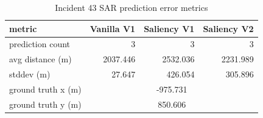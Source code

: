 \begin{table}[ht]
\centering
\caption{Incident 43 SAR prediction error metrics}
\label{tab:sar-incident-43}
\begin{tabular}{lrrr}
\hline
metric & Vanilla V1 & Saliency V1 & Saliency V2 \\
\hline
prediction count & 3 & 3 & 3 \\
avg distance (m) & 2037.446 & 2532.036 & 2231.989 \\
stddev (m) & 27.647 & 426.054 & 305.896 \\
ground truth x (m) & \multicolumn{3}{c}{-975.731} \\
ground truth y (m) & \multicolumn{3}{c}{850.606} \\
\hline
\end{tabular}
\end{table}
